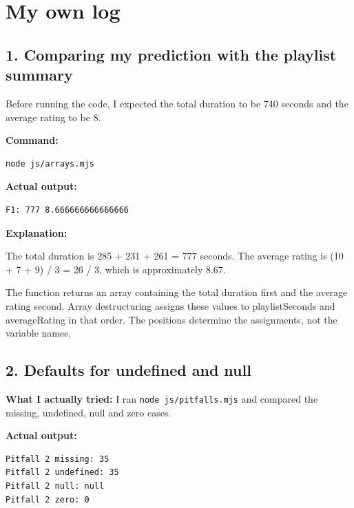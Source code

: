 \documentclass[
  10pt,
  a4paper,
  titlepage]{article}
\newcommand{\passthrough}[1]{#1}
\begin{document}
\section{My own log}\label{my-own-log}

\subsection{1. Comparing my prediction with the playlist
summary}\label{comparing-my-prediction-with-the-playlist-summary}

Before running the code, I expected the total duration to be 740 seconds
and the average rating to be 8.

\textbf{Command:}

\Needspace{30.9pt}
\begin{lstlisting}[language=sh]
node js/arrays.mjs
\end{lstlisting}

\textbf{Actual output:}

\Needspace{30.9pt}
\begin{lstlisting}
F1: 777 8.666666666666666
\end{lstlisting}


\textbf{Explanation:}

The total duration is 285 + 231 + 261 = 777 seconds. The average rating
is (10 + 7 + 9) / 3 = 26 / 3, which is approximately 8.67.

The function returns an array containing the total duration first and
the average rating second. Array destructuring assigns these values to
playlistSeconds and averageRating in that order. The positions determine
the assignments, not the variable names.

\subsection{2. Defaults for undefined and
null}\label{defaults-for-undefined-and-null}

\textbf{What I actually tried:} I ran
\passthrough{\lstinline!node js/pitfalls.mjs!} and compared the missing,
undefined, null and zero cases.

\textbf{Actual output:}

\Needspace{61.8pt}
\begin{lstlisting}
Pitfall 2 missing: 35
Pitfall 2 undefined: 35
Pitfall 2 null: null
Pitfall 2 zero: 0
\end{lstlisting}
\end{document}
